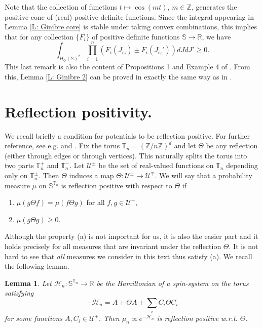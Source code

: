 \documentclass[11pt, reqno]{amsart}
\newtheorem{lemma}[theorem]{Lemma}
\numberwithin{equation}{section}
\theoremstyle{definition}
\theoremstyle{remark}
\newcommand{\ZZ}{\mathbb{Z}}
\newcommand{\RR}{\mathbb{R}}
\renewcommand{\c}[1]{\ensuremath{\mathcal{#1}}}
\newcommand{\J}{J}
\newcommand{\Hstar}{\ensuremath{H_{\Diamond}} }
\begin{document}
Note that the collection of functions $t \mapsto \cos(mt)$, $m \in \ZZ$,
generates the positive cone of (real) positive definite functions. 
Since the integral appearing in Lemma \ref{L: Ginibre core} 
is stable under taking convex combinations, this implies that
for any collection $\{ F_i\}$ of positive definite functions $\mathbb{S} \to \RR$, we have
\[
	\int_{\Hstar(\mathbb{S})^2} \prod_{i=1}^n (F_i(\J_{e_i}) \pm F_i(\J_{e_i}')) d \J d \J' \geq 0.
\]
This last remark is also the content of Propositions 1 and Example 4 of \cite{Gin}. 
From this, Lemma \ref{L: Ginibre 2} can be proved in exactly the same way as in \cite[Proposition 3]{Gin}.

\section{Reflection positivity.} \label{ap:RP}
We recall briefly a condition for potentials to be reflection positive. 
For further reference, see e.g. \cite{Biskup} and \cite{FriVel}. 
Fix the torus $\mathbb{T}_n = (\mathbb{Z} / n\ZZ)^d$ and let $\Theta$ be any reflection
(either through edges or through vertices). 
This naturally splits the torus into two parts $\mathbb{T}_n^+$ and $\mathbb{T}_n^-$. 
Let $\mathscr{U}^{\pm}$ be the set of real-valued functions on $\mathbb{T}_n$ depending only on $\mathbb{T}_n^{\pm}$. 
Then $\Theta$ induces a map $\Theta: \mathscr{U}^{\pm} \to \mathscr{U}^{\mp}$.
We will say that a probability measure $\mu$ on $\mathbb{S}^{\mathbb{T}_n}$ is reflection positive with respect to $\Theta$ if
\vspace{0.2cm}
\begin{enumerate}[\hspace{0.5cm}(a)]
	\item $\mu(g \Theta f) = \mu(f \Theta g)$ for all $f, g \in \mathscr{U}^+$, 
	\item $\mu(g \Theta g) \geq 0$. 
\end{enumerate}
\vspace{0.2cm}
\noindent Although the property (a) is not important for us, it is also the easier part and it holds precisely for all measures that are invariant under the reflection $\Theta$. 
It is not hard to see that \emph{all} measures we consider in this text thus satisfy (a). 
We recall the following lemma. 

\begin{lemma} \label{L: RP condition}
	Let $\c{H}_n:\mathbb{S}^{\mathbb{T}_n} \to \RR$ be the Hamiltonian of a spin-system on the torus satisfying
	\[
		-\c{H}_n = A + \Theta A + \sum_{i} C_i \Theta C_i
	\]
	for some functions $A, C_{i} \in \mathscr{U}^+$. Then $\mu_n \propto e^{-\c{H}_n}$ is reflection positive w.r.t. $\Theta$. 
\end{lemma}
\end{document}
